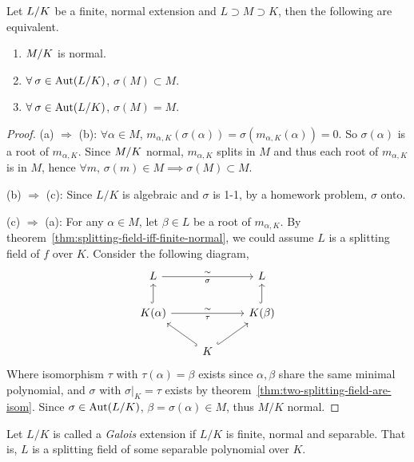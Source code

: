 \begin{prop} \label{prop:TFAE-of-normal-extension}
  Let ${L}/{K}$ be a finite, normal extension and $L \supset M \supset K$, then the following
  are equivalent.

  \begin{enumerate}[(\alph*)]
    \item ${M}/{K}$ is normal.
    \item $\forall \sigma \in \Aut(\quot{L}{K})$, $\sigma(M) \subset M$.
    \item $\forall \sigma \in \Aut(\quot{L}{K})$, $\sigma(M) = M$.
  \end{enumerate}

  \begin{proof}
    (a) $\Rightarrow$ (b): $\forall \alpha \in M$, $m_{\alpha, K}(\sigma(\alpha))
    = \sigma(m_{\alpha, K}(\alpha)) = 0$. So $\sigma(\alpha)$ is a root of $m_{\alpha, K}$.
    Since ${M}/{K}$ normal, $m_{\alpha, K}$ splits in $M$ and thus each root
    of $m_{\alpha, K}$ is in $M$, hence $\forall m, \, \sigma(m) \in M \implies \sigma(M) \subset M$.

    (b) $\Rightarrow$ (c): Since $L/K$ is algebraic and $\sigma$ is 1-1,
    by a homework problem, $\sigma$ onto.

    (c) $\Rightarrow$ (a): For any $\alpha \in M$, let $\beta \in L$ be a root of $m_{\alpha, K}$.
    By theorem~\ref{thm:splitting-field-iff-finite-normal}, we could assume $L$
    is a splitting field of $f$ over $K$. Consider the following diagram,
    \[
      \begin{tikzcd}
        L \arrow[rr, "\sim", "\sigma"'] & & L \\
        K(\alpha) \arrow[u, hookrightarrow] \arrow[rr, "\sim", "\tau"'] & & K(\beta) \arrow[u, hookrightarrow] \\
        & K \arrow[ur, hookrightarrow] \arrow[ul, hookrightarrow] &
      \end{tikzcd}
    \]
    Where isomorphism $\tau$ with $\tau(\alpha) = \beta$ exists
    since $\alpha, \beta$ share the same minimal polynomial,
    and $\sigma$ with $\sigma\big|_K = \tau$ exists by theorem~\ref{thm:two-splitting-field-are-isom}.
    Since $\sigma \in \operatorname{Aut}({L}/{K})$, $\beta = \sigma(\alpha) \in M$, thus $M/K$ normal.
  \end{proof}
\end{prop}

\begin{definition}
  Let $L/K$ is called a \emph{Galois} extension
  if $L/K$ is finite, normal and separable.
  That is, $L$ is a splitting field of some separable polynomial over $K$.
\end{definition}

